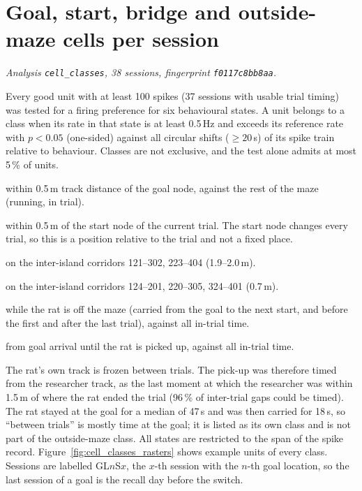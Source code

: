 \section{Goal, start, bridge and outside-maze cells per session}
\label{sec:cell_classes}
\noindent\textit{Analysis \texttt{cell\_classes}, 38 sessions, fingerprint \texttt{f0117c8bb8aa}.}

Every good unit with at least 100 spikes (37 sessions with usable trial timing) was tested for a firing preference for six behavioural states. A unit belongs to a class when its rate in that state is at least 0.5\,Hz and exceeds its reference rate with $p<0.05$ (one-sided) against all circular shifts ($\geq 20$\,s) of its spike train relative to behaviour. Classes are not exclusive, and the test alone admits at most 5\,\% of units.
\begin{description}\setlength{\itemsep}{0pt}
\item[Goal] within 0.5\,m track distance of the goal node, against the rest of the maze (running, in trial).
\item[Start] within 0.5\,m of the start node of the current trial. The start node changes every trial, so this is a position relative to the trial and not a fixed place.
\item[Long bridge] on the inter-island corridors 121--302, 223--404 (1.9--2.0\,m).
\item[Short bridge] on the inter-island corridors 124--201, 220--305, 324--401 (0.7\,m).
\item[Outside maze] while the rat is off the maze (carried from the goal to the next start, and before the first and after the last trial), against all in-trial time.
\item[At goal after arrival] from goal arrival until the rat is picked up, against all in-trial time.
\end{description}
The rat's own track is frozen between trials. The pick-up was therefore timed from the researcher track, as the last moment at which the researcher was within 1.5\,m of where the rat ended the trial (96\,\% of inter-trial gaps could be timed). The rat stayed at the goal for a median of 47\,s and was then carried for 18\,s, so ``between trials'' is mostly time at the goal; it is listed as its own class and is not part of the outside-maze class. All states are restricted to the span of the spike record. Figure~\ref{fig:cell_classes_rasters} shows example units of every class. Sessions are labelled GL$n$S$x$, the $x$-th session with the $n$-th goal location, so the last session of a goal is the recall day before the switch.


